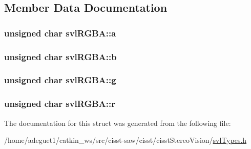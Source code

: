 \subsection{Member Data Documentation}
\hypertarget{structsvl_r_g_b_a_a013e40506e5c6adcec1dc614b2634c76}{
\subsubsection[{a}]{\setlength{\rightskip}{0pt plus 5cm}unsigned char svl\-R\-G\-B\-A\-::a}}\label{structsvl_r_g_b_a_a013e40506e5c6adcec1dc614b2634c76}
\hypertarget{structsvl_r_g_b_a_a7c139a15f87df0e403d602573029f063}{
\subsubsection[{b}]{\setlength{\rightskip}{0pt plus 5cm}unsigned char svl\-R\-G\-B\-A\-::b}}\label{structsvl_r_g_b_a_a7c139a15f87df0e403d602573029f063}
\hypertarget{structsvl_r_g_b_a_a367a65b4b35bc3b855a6d818c843d02f}{
\subsubsection[{g}]{\setlength{\rightskip}{0pt plus 5cm}unsigned char svl\-R\-G\-B\-A\-::g}}\label{structsvl_r_g_b_a_a367a65b4b35bc3b855a6d818c843d02f}
\hypertarget{structsvl_r_g_b_a_a851a1703a424dd9d4330eb669094e991}{
\subsubsection[{r}]{\setlength{\rightskip}{0pt plus 5cm}unsigned char svl\-R\-G\-B\-A\-::r}}\label{structsvl_r_g_b_a_a851a1703a424dd9d4330eb669094e991}


The documentation for this struct was generated from the following file\-:\begin{DoxyCompactItemize}
\item 
/home/adeguet1/catkin\-\_\-ws/src/cisst-\/saw/cisst/cisst\-Stereo\-Vision/\hyperlink{svl_types_8h}{svl\-Types.\-h}\end{DoxyCompactItemize}

